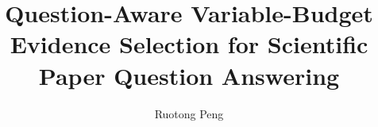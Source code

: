 \documentclass[a4paper,11pt,twoside]{report}
\title{Question-Aware Variable-Budget Evidence Selection for Scientific Paper Question Answering}
\author{Ruotong Peng}
\begin{document}





\tableofcontents
\listoffigures
\listoftables
\clearpage









\clearpage
\renewcommand{\bibname}{References}





\appendix

\end{document}
